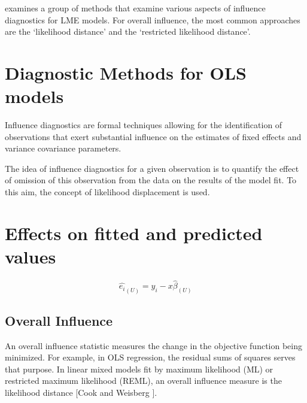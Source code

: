 \documentclass[12pt, a4paper]{article}
\begin{document}
			
			\citet{west} examines a group of methods that examine various aspects of influence diagnostics for LME models.
			For overall influence, the most common approaches are the `likelihood distance' and the `restricted likelihood distance'.
			
			
			
			
			\section*{Diagnostic Methods for OLS models}
			Influence diagnostics are formal techniques allowing for the identification of observations that exert substantial 
			influence on the estimates of fixed effects and variance covariance parameters. 
			
			The idea of influence diagnostics for a given observation is to quantify the effect of omission of this observation 
			from the data on the results of the model fit. To this aim, the concept of likelihood displacement is used. 
			
			
			
			
			
			\section{Effects on fitted and predicted values}
			\begin{equation}
			\hat{e_{i}}_{(U)} = y_{i} - x\hat{\beta}_{(U)}
			\end{equation}
			
			
			
			
			
			
			
			\subsection{Overall Influence}
			An overall influence statistic measures the change in the objective function being minimized. For example, in
			OLS regression, the residual sums of squares serves that purpose. In linear mixed models fit by
			 maximum likelihood (ML) or  restricted maximum likelihood (REML), an overall influence measure is the  likelihood distance [Cook and Weisberg ].
			
\end{document}
